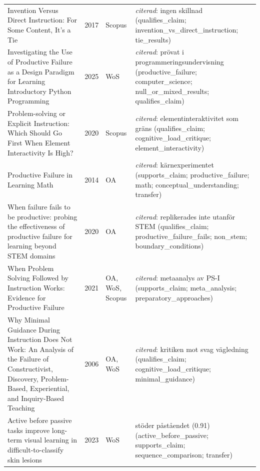 \begin{longtable}{@{}%
  >{\raggedright\arraybackslash}p{}c%
  >{\raggedright\arraybackslash}p{}%
  >{\raggedright\arraybackslash\footnotesize}p{}@{}}
Invention Versus Direct Instruction: For Some Content, It's a Tie & 2017 & Scopus & \emph{citerad}: ingen skillnad (qualifies\_\allowbreak{}claim; invention\_\allowbreak{}vs\_\allowbreak{}direct\_\allowbreak{}instruction; tie\_\allowbreak{}results) \\
Investigating the Use of Productive Failure as a Design Paradigm for Learning Introductory Python Programming & 2025 & WoS & \emph{citerad}: prövat i programmeringsundervisning (productive\_\allowbreak{}failure; computer\_\allowbreak{}science; null\_\allowbreak{}or\_\allowbreak{}mixed\_\allowbreak{}results; qualifies\_\allowbreak{}claim) \\
Problem-solving or Explicit Instruction: Which Should Go First When Element Interactivity Is High? & 2020 & Scopus & \emph{citerad}: elementinteraktivitet som gräns (qualifies\_\allowbreak{}claim; cognitive\_\allowbreak{}load\_\allowbreak{}critique; element\_\allowbreak{}interactivity) \\
Productive Failure in Learning Math & 2014 & OA & \emph{citerad}: kärnexperimentet (supports\_\allowbreak{}claim; productive\_\allowbreak{}failure; math; conceptual\_\allowbreak{}understanding; transfer) \\
When failure fails to be productive: probing the effectiveness of productive failure for learning beyond STEM domains & 2020 & OA & \emph{citerad}: replikerades inte utanför STEM (qualifies\_\allowbreak{}claim; productive\_\allowbreak{}failure\_\allowbreak{}fails; non\_\allowbreak{}stem; boundary\_\allowbreak{}conditions) \\
When Problem Solving Followed by Instruction Works: Evidence for Productive Failure & 2021 & OA, WoS, Scopus & \emph{citerad}: metaanalys av PS-I (supports\_\allowbreak{}claim; meta\_\allowbreak{}analysis; preparatory\_\allowbreak{}approaches) \\
Why Minimal Guidance During Instruction Does Not Work: An Analysis of the Failure of Constructivist, Discovery, Problem-Based, Experiential, and Inquiry-Based Teaching & 2006 & OA, WoS & \emph{citerad}: kritiken mot svag vägledning (qualifies\_\allowbreak{}claim; cognitive\_\allowbreak{}load\_\allowbreak{}critique; minimal\_\allowbreak{}guidance) \\
Active before passive tasks improve long-term visual learning in difficult-to-classify skin lesions & 2023 & WoS & stöder påståendet (0.91) (active\_\allowbreak{}before\_\allowbreak{}passive; supports\_\allowbreak{}claim; sequence\_\allowbreak{}comparison; transfer) \\

\end{longtable}
